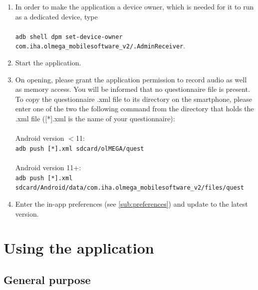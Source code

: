 \documentclass[11pt,a4paper,titlepage]{article}
\begin{document}
\begin{enumerate}
	\item In order to make the application a device owner, which is needed for it to run as a dedicated device, type\\
	\\
	\colorbox{black!10}{\texttt{adb shell dpm set-device-owner com.iha.olmega\_mobilesoftware\_v2/.AdminReceiver}}.\\
	
	\item Start the application.\\
	
	\item On opening, please grant the application permission to record audio as well as memory access. You will be informed that no questionnaire file is present. To copy the questionnaire .xml file to its directory on the smartphone, please enter one of the two the following command from the directory that holds the .xml file ([*].xml is the name of your questionnaire):\\
	\\
	Android version $<$11:\\
	\colorbox{black!10}{\texttt{adb push [*].xml sdcard/olMEGA/quest}}\\
	\\
	Android version 11+:\\
	\colorbox{black!10}{\texttt{adb push [*].xml sdcard/Android/data/com.iha.olmega\_mobilesoftware\_v2/files/quest}}\\
	
	\item Enter the in-app preferences (see \ref{sub:preferences}) and update to the latest version.
	
\end{enumerate}

\newpage

\section{Using the application}\label{sec_usage}


\subsection{General purpose}
\end{document}
